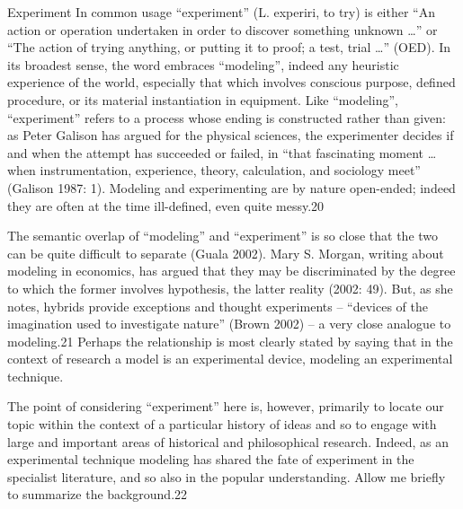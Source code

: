 Experiment In common usage ``experiment'' (L. experiri, to try) is
either ``An action or operation undertaken in order to discover
something unknown \ldots{}'' or ``The action of trying anything, or
putting it to proof; a test, trial \ldots{}'' (OED). In its broadest
sense, the word embraces ``modeling'', indeed any heuristic experience
of the world, especially that which involves conscious purpose, defined
procedure, or its material instantiation in equipment. Like
``modeling'', ``experiment'' refers to a process whose ending is
constructed rather than given: as Peter Galison has argued for the
physical sciences, the experimenter decides if and when the attempt has
succeeded or failed, in ``that fascinating moment \ldots{} when
instrumentation, experience, theory, calculation, and sociology meet''
(Galison 1987: 1). Modeling and experimenting are by nature open-ended;
indeed they are often at the time ill-defined, even quite messy.20

The semantic overlap of ``modeling'' and ``experiment'' is so close that
the two can be quite difficult to separate (Guala 2002). Mary S. Morgan,
writing about modeling in economics, has argued that they may be
discriminated by the degree to which the former involves hypothesis, the
latter reality (2002: 49). But, as she notes, hybrids provide exceptions
and thought experiments -- ``devices of the imagination used to
investigate nature'' (Brown 2002) -- a very close analogue to
modeling.21 Perhaps the relationship is most clearly stated by saying
that in the context of research a model is an experimental device,
modeling an experimental technique.

The point of considering ``experiment'' here is, however, primarily to
locate our topic within the context of a particular history of ideas and
so to engage with large and important areas of historical and
philosophical research. Indeed, as an experimental technique modeling
has shared the fate of experiment in the specialist literature, and so
also in the popular understanding. Allow me briefly to summarize the
background.22

